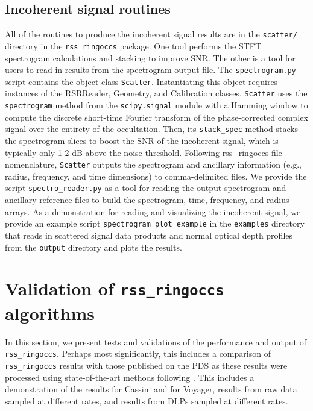 \documentclass[titlepage, 12pt]{article}
\begin{document}
     \subsection{Incoherent signal routines}
            All of the routines to produce the incoherent signal results are
            in the \texttt{scatter/} directory in the
            \texttt{rss\_ringoccs} package. One tool performs the STFT spectrogram
            calculations and stacking to improve SNR. The other is a tool
            for users to read in results from the spectrogram output file.
            The \texttt{spectrogram.py} script contains the object class \texttt{Scatter}.
            Instantiating this object requires instances of the RSRReader, Geometry, 
            and Calibration classes. \texttt{Scatter} uses the \texttt{spectrogram} method 
            from the \texttt{scipy.signal} module with a Hamming window to compute 
            the discrete short-time Fourier transform of the phase-corrected complex 
            signal over the entirety of the occultation. Then, its \texttt{stack\_spec}
            method stacks the spectrogram slices to boost the SNR of the incoherent
            signal, which is typically only 1-2 dB above the noise threshold. Following
            rss\_ringoccs file nomenclature, \texttt{Scatter} outputs the spectrogram
            and ancillary information (e.g., radius, frequency, and time dimensions)
            to comma-delimited files.
            We provide the script \texttt{spectro\_reader.py} as a tool for reading the
            output spectrogram and ancillary reference files to build the spectrogram,
            time, frequency, and radius arrays. As a demonstration for reading and visualizing the incoherent signal, we provide an example script \texttt{spectrogram\_plot\_example} in 
            the \texttt{examples} directory that reads in scattered signal data products and 
            normal optical depth profiles from the \texttt{output} directory and plots the results.

    \section{Validation of \texttt{rss\_ringoccs} algorithms}
        In this section, we present tests and validations
        of the performance and output of \texttt{rss\_ringoccs}.
        Perhaps most significantly, this includes a comparison
        of \texttt{rss\_ringoccs} results with those published
        on the PDS as these results were processed using
        state-of-the-art methods following \citet{Marouf1986}.
        This includes a demonstration of the results for
        Cassini and for Voyager, results from raw data sampled
        at different rates, and results from DLPs sampled at
        different rates.
\end{document}
